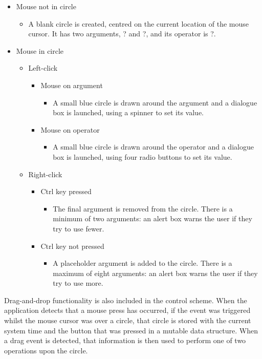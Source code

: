 \documentclass[12pt,twoside,notitlepage,xetex]{report}
\begin{document}
{\begin{itemize}
\item Mouse not in circle
\begin{itemize}
\item A blank circle is created, centred on the current location of the mouse cursor.  It has two arguments, {\sfapp ?} and {\sfapp ?}, and its operator is {\sfapp ?}.
\end{itemize}
\item Mouse in circle
\begin{itemize}
\item Left-click
\begin{itemize}
\item Mouse on argument
\begin{itemize}
\item A small blue circle is drawn around the argument and a dialogue box is launched, using a spinner to set its value.
\end{itemize}
\item Mouse on operator
\begin{itemize}
\item A small blue circle is drawn around the operator and a dialogue box is launched, using four radio buttons to set its value.
\end{itemize}
\end{itemize}
\item Right-click
\begin{itemize}
\item Ctrl key pressed
\begin{itemize}
\item The final argument is removed from the circle.  There is a minimum of two arguments: an alert box warns the user if they try to use fewer.
\end{itemize}
\item Ctrl key not pressed
\begin{itemize}
\item A placeholder argument is added to the circle.  There is a maximum of eight arguments: an alert box warns the user if they try to use more.
\end{itemize}
\end{itemize}
\end{itemize}
\end{itemize}

Drag-and-drop functionality is also included in the control scheme.  When the application detects that a mouse press has occurred, if the event was triggered whilst the mouse cursor was over a circle, that circle is stored with the current system time and the button that was pressed in a mutable data structure.  When a drag event is detected, that information is then used to perform one of two operations upon the circle.

}
\end{document}
